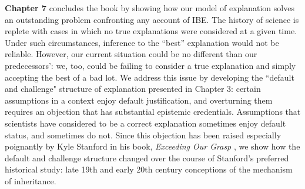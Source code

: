 \documentclass{article}[11pt]
\begin{document}
\textbf{Chapter 7} concludes the book by  showing how our model of explanation solves an outstanding problem confronting any account of IBE.  The history of science is replete with cases in which no true explanations were considered at a given time. Under such circumstances, inference to the ``best'' explanation would not be reliable.  However, our current situation could be no different than our predecessors’: we, too, could be failing to consider a true explanation and simply accepting the best of a bad lot.  We address this issue by developing the ``default and challenge" structure of explanation presented in Chapter 3: certain assumptions in a context enjoy default justification, and overturning them requires an objection that has substantial epistemic credentials. Assumptions that scientists have considered to be a correct explanation sometimes enjoy default status, and sometimes do not. Since this objection has been raised especially poignantly by Kyle Stanford in his book, \textit{Exceeding Our Grasp} \parencite*{Stanford2006}, we show how the default and challenge structure changed over the course of Stanford's preferred historical study: late 19th and early 20th century conceptions of the mechanism of inheritance.




\end{document}
